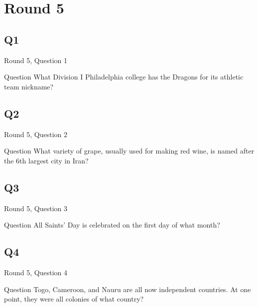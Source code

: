 \documentclass[11pt]{beamer}
\begin{document}
\section{Round 5}
    

\subsection*{Q1}
\begin{frame}[t]{Round 5, Question 1}
\vspace{2em}
\begin{block}{Question}
What Division I Philadelphia college has the Dragons for its athletic team nickname\@?
\end{block}
\end{frame}
    

\subsection*{Q2}
\begin{frame}[t]{Round 5, Question 2}
\vspace{2em}
\begin{block}{Question}
What variety of grape, usually used for making red wine, is named after the 6th largest city in Iran\@?
\end{block}
\end{frame}
    

\subsection*{Q3}
\begin{frame}[t]{Round 5, Question 3}
\vspace{2em}
\begin{block}{Question}
All Saints' Day is celebrated on the first day of what month\@?
\end{block}
\end{frame}
    

\subsection*{Q4}
\begin{frame}[t]{Round 5, Question 4}
\vspace{2em}
\begin{block}{Question}
Togo, Cameroon, and Nauru are all now independent countries. At one point, they were all colonies of what country\@?
\end{block}
\end{frame}
    
\end{document}
